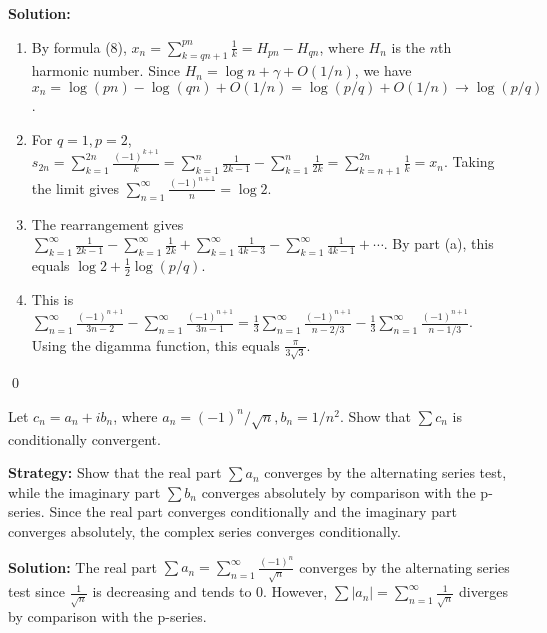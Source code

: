 \bigskip\noindent\textbf{Solution:}
\begin{enumerate}[label=(\alph*)]
\item By formula (8), \(x_n = \sum_{k=qn+1}^{pn} \frac{1}{k} = H_{pn} - H_{qn}\), where \(H_n\) is the \(n\)th harmonic number. Since \(H_n = \log n + \gamma + O(1/n)\), we have \(x_n = \log(pn) - \log(qn) + O(1/n) = \log(p/q) + O(1/n) \to \log(p/q)\).

\item For \(q=1, p=2\), \(s_{2n} = \sum_{k=1}^{2n} \frac{(-1)^{k+1}}{k} = \sum_{k=1}^{n} \frac{1}{2k-1} - \sum_{k=1}^{n} \frac{1}{2k} = \sum_{k=n+1}^{2n} \frac{1}{k} = x_n\). Taking the limit gives \(\sum_{n=1}^{\infty} \frac{(-1)^{n+1}}{n} = \log 2\).

\item The rearrangement gives \(\sum_{k=1}^{\infty} \frac{1}{2k-1} - \sum_{k=1}^{\infty} \frac{1}{2k} + \sum_{k=1}^{\infty} \frac{1}{4k-3} - \sum_{k=1}^{\infty} \frac{1}{4k-1} + \cdots\). By part (a), this equals \(\log 2 + \frac{1}{2}\log(p/q)\).

\item This is \(\sum_{n=1}^{\infty} \frac{(-1)^{n+1}}{3n-2} - \sum_{n=1}^{\infty} \frac{(-1)^{n+1}}{3n-1} = \frac{1}{3}\sum_{n=1}^{\infty} \frac{(-1)^{n+1}}{n-2/3} - \frac{1}{3}\sum_{n=1}^{\infty} \frac{(-1)^{n+1}}{n-1/3}\). Using the digamma function, this equals \(\frac{\pi}{3\sqrt{3}}\).
\end{enumerate}\qed



\begin{problembox}
Let \(c_n = a_n + ib_n\), where \(a_n = (-1)^n/\sqrt{n}, b_n = 1/n^2\). Show that \(\sum c_n\) is conditionally convergent.
\end{problembox}

\noindent\textbf{Strategy:} Show that the real part \(\sum a_n\) converges by the alternating series test, while the imaginary part \(\sum b_n\) converges absolutely by comparison with the p-series. Since the real part converges conditionally and the imaginary part converges absolutely, the complex series converges conditionally.

\bigskip\noindent\textbf{Solution:}
The real part \(\sum a_n = \sum_{n=1}^{\infty} \frac{(-1)^n}{\sqrt{n}}\) converges by the alternating series test since \(\frac{1}{\sqrt{n}}\) is decreasing and tends to 0. However, \(\sum |a_n| = \sum_{n=1}^{\infty} \frac{1}{\sqrt{n}}\) diverges by comparison with the p-series.

